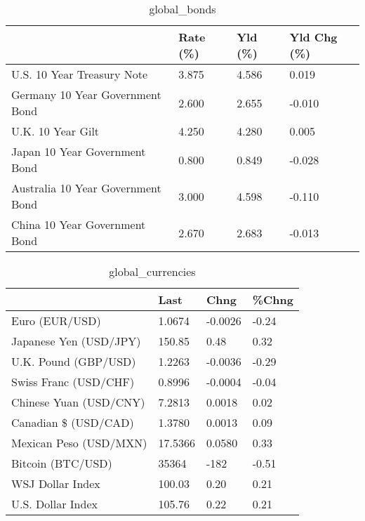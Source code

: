 \documentclass{article}%
\begin{document}
%


\begin{table}[htbp]%
\caption{global\_bonds}%
\centering%
\begin{adjustbox}{width=1\textwidth}%
\begin{tabular}{llll}
\toprule
                                  & Rate (\%) & Yld (\%) & Yld Chg (\%) \\
\midrule
       U.S. 10 Year Treasury Note &    3.875 &   4.586 &       0.019 \\
  Germany 10 Year Government Bond &    2.600 &   2.655 &      -0.010 \\
                U.K. 10 Year Gilt &    4.250 &   4.280 &       0.005 \\
    Japan 10 Year Government Bond &    0.800 &   0.849 &      -0.028 \\
Australia 10 Year Government Bond &    3.000 &   4.598 &      -0.110 \\
    China 10 Year Government Bond &    2.670 &   2.683 &      -0.013 \\
\bottomrule
\end{tabular}
%
\end{adjustbox}%
\end{table}

%


\begin{table}[htbp]%
\caption{global\_currencies}%
\centering%
\begin{adjustbox}{width=1\textwidth}%
\begin{tabular}{llll}
\toprule
                       &    Last &    Chng & \%Chng \\
\midrule
        Euro (EUR/USD) &  1.0674 & -0.0026 & -0.24 \\
Japanese Yen (USD/JPY) &  150.85 &    0.48 &  0.32 \\
  U.K. Pound (GBP/USD) &  1.2263 & -0.0036 & -0.29 \\
 Swiss Franc (USD/CHF) &  0.8996 & -0.0004 & -0.04 \\
Chinese Yuan (USD/CNY) &  7.2813 &  0.0018 &  0.02 \\
  Canadian \$ (USD/CAD) &  1.3780 &  0.0013 &  0.09 \\
Mexican Peso (USD/MXN) & 17.5366 &  0.0580 &  0.33 \\
     Bitcoin (BTC/USD) &   35364 &    -182 & -0.51 \\
      WSJ Dollar Index &  100.03 &    0.20 &  0.21 \\
     U.S. Dollar Index &  105.76 &    0.22 &  0.21 \\
\bottomrule
\end{tabular}
%
\end{adjustbox}%
\end{table}
\end{document}
